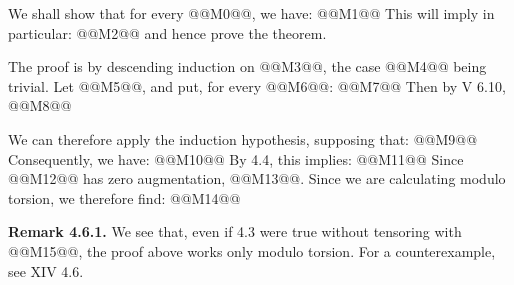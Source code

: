 We shall show that for every @@M0@@, we have:
@@M1@@
This will imply in particular:
@@M2@@
and hence prove the theorem.

The proof is by descending induction on @@M3@@, the case @@M4@@ being trivial. Let @@M5@@, and put, for every @@M6@@:
@@M7@@
Then by V 6.10,
@@M8@@

We can therefore apply the induction hypothesis, supposing that:
@@M9@@
Consequently, we have:
@@M10@@
By 4.4, this implies:
@@M11@@
Since @@M12@@ has zero augmentation, @@M13@@.
Since we are calculating modulo torsion, we therefore find:
@@M14@@

\textbf{Remark 4.6.1.} We see that, even if 4.3 were true without tensoring with @@M15@@, the proof above works only modulo torsion. For a counterexample, see XIV 4.6.

